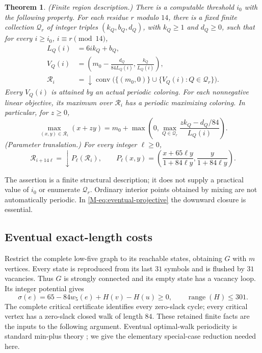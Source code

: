 \documentclass[11pt,reqno]{amsart}
\theoremstyle{plain}
\newtheorem{theorem}{Theorem}
\theoremstyle{plain}
\theoremstyle{plain}
\begin{document}
\begin{theorem}\label{M-thm:eventual-high-regions}
\textup{(Finite region description.)} There is a computable threshold $i_0$ with the following property.
For each residue $r$ modulo $14$, there is a fixed finite collection
$\mathcal Q_r$ of integer triples $(k_Q,b_Q,d_Q)$, with $k_Q\ge1$ and
$d_Q\ge0$, such that for every $i\ge i_0$, $i\equiv r\pmod {14}$,
\begin{align}
L_Q(i)&=6ik_Q+b_Q,\nonumber\\
V_Q(i)&=\left(m_0-\frac{d_Q}{84L_Q(i)},
                     \frac{k_Q}{L_Q(i)}\right),\nonumber\\
\mathcal R_i&=\downarrow\operatorname{conv}
       \bigl(\{(m_0,0)\}\cup\{V_Q(i):Q\in\mathcal Q_r\}\bigr).
\label{M-eq:eventual-region-formula}
\end{align}
Every $V_Q(i)$ is attained by an actual periodic coloring. For each
nonnegative linear objective, its maximum over $\mathcal R_i$ has a
periodic maximizing coloring. In particular, for $z\ge0$,
\begin{equation}\label{M-eq:eventual-support}
\max_{(x,y)\in\mathcal R_i}(x+zy)
=m_0+\max\left(0,\max_{Q\in\mathcal Q_r}
              \frac{zk_Q-d_Q/84}{L_Q(i)}\right).
\end{equation}
\smallskip\noindent\textup{(Parameter translation.)} For every integer $\ell\ge0$,
\begin{equation}\label{M-eq:eventual-projective}
\mathcal R_{i+14\ell}=\downarrow P_\ell(\mathcal R_i),\qquad
P_\ell(x,y)=\left(\frac{x+65\ell y}{1+84\ell y},
                       \frac{y}{1+84\ell y}\right).
\end{equation}
\end{theorem}

The assertion is a finite structural description; it does not supply a
practical value of $i_0$ or enumerate $\mathcal Q_r$. Ordinary interior
points obtained by mixing are not automatically periodic. In
\eqref{M-eq:eventual-projective} the downward closure is essential.

\subsection{Eventual exact-length costs}

Restrict the complete low-five graph to its reachable states, obtaining
$G$ with $m$ vertices. Every state is reproduced from its last $31$ symbols
and is flushed by $31$ vacancies. Thus $G$ is strongly connected and its
empty state has a vacancy loop. Its integer potential gives
\[
\sigma(e)=65-84w_5(e)+H(v)-H(u)\ge0,
\qquad\operatorname{range}(H)\le301.
\]
The complete critical certificate identifies every zero-slack cycle;
every critical vertex has a zero-slack closed walk of length $84$.
These retained finite facts are the inputs to the following argument.
Eventual optimal-walk periodicity is standard min-plus theory
\cite{M-CFN12}; we give the elementary special-case reduction needed here.
\end{document}
